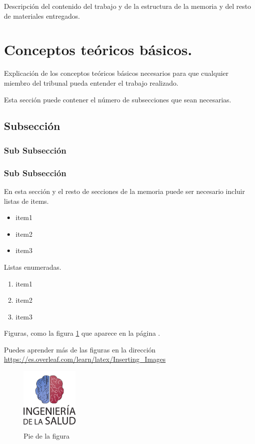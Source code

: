 

Descripción del contenido del trabajo y de la estructura de la memoria y del resto de materiales entregados.


\section{Conceptos teóricos básicos.}

Explicación de los conceptos teóricos básicos necesarios para que cualquier miembro del tribunal pueda entender el trabajo realizado.

Esta sección puede contener el número de subsecciones que sean necesarias.

\subsection{Subsección}

\subsubsection{Sub Subsección}

\subsubsection{Sub Subsección}

En esta sección y el resto de secciones de la memoria puede ser necesario incluir listas de items.

\begin{itemize}
    \item item1
    \item item2
    \item item3
\end{itemize}

Listas enumeradas.

\begin{enumerate}
    \item item1
    \item item2
    \item item3
\end{enumerate}

Figuras, como la figura \ref{fig:escudo} que aparece en la página \pageref{fig:escudo}. 

Puedes aprender más de las figuras en la dirección \url{https://es.overleaf.com/learn/latex/Inserting_Images}

\begin{figure}[h]
    \centering
    \includegraphics[width=0.25\textwidth]{img/escudoSalud.pdf}
    \caption{Pie de la figura}
    \label{fig:escudo}
\end{figure}


